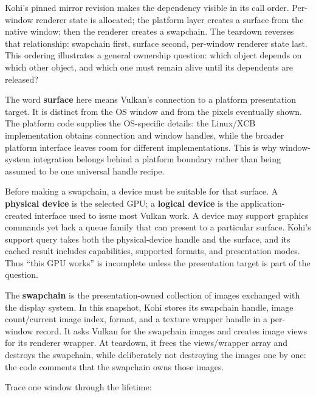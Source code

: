 Kohi's pinned mirror revision makes the dependency visible in its call order. Per-window renderer state is allocated; the platform layer creates a surface from the native window; then the renderer creates a swapchain. The teardown reverses that relationship: swapchain first, surface second, per-window renderer state last. This ordering illustrates a general ownership question: which object depends on which other object, and which one must remain alive until its dependents are released?

The word \textbf{surface} here means Vulkan's connection to a platform presentation target. It is distinct from the OS window and from the pixels eventually shown. The platform code supplies the OS-specific details: the Linux/XCB implementation obtains connection and window handles, while the broader platform interface leaves room for different implementations. This is why window-system integration belongs behind a platform boundary rather than being assumed to be one universal handle recipe.

Before making a swapchain, a device must be suitable for that surface. A \textbf{physical device} is the selected GPU; a \textbf{logical device} is the application-created interface used to issue most Vulkan work. A device may support graphics commands yet lack a queue family that can present to a particular surface. Kohi's support query takes both the physical-device handle and the surface, and its cached result includes capabilities, supported formats, and presentation modes. Thus ``this GPU works'' is incomplete unless the presentation target is part of the question.

The \textbf{swapchain} is the presentation-owned collection of images exchanged with the display system. In this snapshot, Kohi stores its swapchain handle, image count/current image index, format, and a texture wrapper handle in a per-window record. It asks Vulkan for the swapchain images and creates image views for its renderer wrapper. At teardown, it frees the views/wrapper array and destroys the swapchain, while deliberately not destroying the images one by one: the code comments that the swapchain owns those images.

Trace one window through the lifetime:

